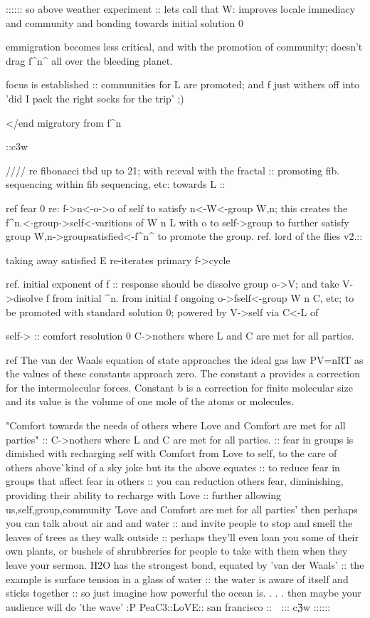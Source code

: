 {{{{{{{{{{{:::::: so {} above {weather experiment} :: lets call that W:  improves locale immediacy and community and bonding towards initial {solution 0}

emmigration becomes less critical, and with the promotion of community; doesn't drag f^n^{} all over the bleeding planet.

focus is established :: communities for L are promoted; and f just withers off into 'did I pack the right socks for the trip' ;)

</end migratory from f^n} ::c3w

//// re fibonacci {tbd}
up to 21; with re:eval with the fractal :: promoting fib. sequencing within fib sequencing, etc: towards L
:: 


{ref fear 0} re: f->n<-o->o of {self} to satisfy n<-W<-{group W,n}; this creates the f^n.<-{group}->{self}<-{varitions of W n L}
with o to {self}->{group} to further satisfy {group W,n}->group{satisfied}<-f^n^{} to promote the group.
{ref. lord of the flies v2.}::{taking away satisfied E re-iterates primary f->{cycle}
{ref. initial exponent of f :: response should be dissolve group o->V; and take V->{disolve f from initial ^n. from initial f}
ongoing o->f{self}<-{group W n C, etc}; to be promoted with standard {solution 0}; powered by V->{self} via C<-L of {self->
    :: {comfort resolution 0} {C->n{others} where L and C are met for all parties.}




ref
The van der Waals equation of state approaches the ideal gas law PV=nRT as the values of these constants approach zero. The constant a provides a correction for the intermolecular forces. Constant b is a correction for finite molecular size and its value is the volume of one mole of the atoms or molecules.


"Comfort towards the needs of others where Love and Comfort are met for all parties" :: C->n{others} where L and C are met for all parties. :: fear in groups is dimished with recharging self with Comfort from Love to self, to the care of others {above^^ kind of a sky joke but its the above equates} :: to reduce fear in groups that affect fear in others :: you can reduction {others} fear, diminishing, providing their ability to recharge with Love :: further allowing {us,self,group,community} 'Love and Comfort are met for all parties' then perhaps you can talk about air and and water :: and invite people to stop and smell the leaves of trees as they walk outside :: perhaps they'll even loan you some of their own plants, or bushels of shrubbreries for people to take with them when they leave your sermon. H2O has the strongest bond, equated by 'van der Waals' :: the example is surface tension in a glass of water :: the water is aware of itself and sticks together :: so just imagine how powerful the ocean is. . . . then maybe your audience will do 'the wave' :P PeaC3::LoVE:: san francisco :: 🌿 ::: cℨw ::::::


}}}}}}}}}}}}}
